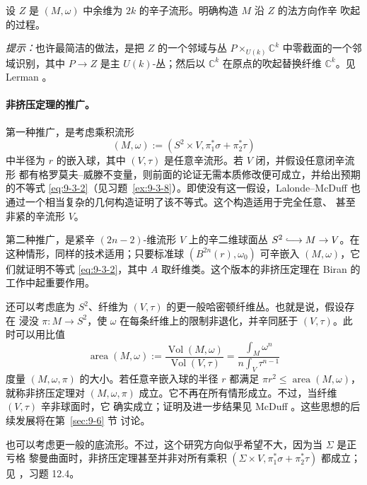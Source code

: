 \begin{exercise}\label{ex:9-3-7}
设 $Z$ 是 $(M,\omega)$ 中余维为 $2k$ 的辛子流形。明确构造 $M$ 沿 $Z$ 的法方向作辛
吹起的过程。

\emph{提示：}也许最简洁的做法，是把 $Z$ 的一个邻域与丛
$P\times_{U(k)}\mathbb C^k$ 中零截面的一个邻域识别，其中
$P\to Z$ 是主 $U(k)$-丛；然后以 $\mathbb C^k$ 在原点的吹起替换纤维
$\mathbb C^k$。见 Lerman 。
\end{exercise}

\paragraph{非挤压定理的推广。}

第一种推广，是考虑乘积流形
\[
  (M,\omega):=(S^2\times V,\pi_1^*\sigma+\pi_2^*\tau)
\]
中半径为 $r$ 的嵌入球，其中 $(V,\tau)$ 是任意辛流形。若 $V$ 闭，并假设任意闭辛流形
都有格罗莫夫--威滕不变量，则前面的论证无需本质修改便可成立，并给出预期的不等式
\eqref{eq:9-3-2}（见习题~\ref{ex:9-3-8}）。即使没有这一假设，Lalonde--McDuff
 也通过一个相当复杂的几何构造证明了该不等式。这个构造适用于完全任意、
甚至非紧的辛流形 $V$。

第二种推广，是紧辛 $(2n-2)$-维流形 $V$ 上的辛二维球面丛
$S^2\lhook\joinrel\longrightarrow M\to V$。在这种情形，同样的技术适用；只要标准球
$(B^{2n}(r),\omega_0)$ 可辛嵌入 $(M,\omega)$，它们就证明不等式
\eqref{eq:9-3-2}，其中 $A$ 取纤维类。这个版本的非挤压定理在 Biran
 的工作中起重要作用。

还可以考虑底为 $S^2$、纤维为 $(V,\tau)$ 的更一般哈密顿纤维丛。也就是说，假设存在
浸没 $\pi:M\to S^2$，使 $\omega$ 在每条纤维上的限制非退化，并辛同胚于
$(V,\tau)$。此时可以用比值
\[
  \operatorname{area}(M,\omega)
  :=\frac{\operatorname{Vol}(M,\omega)}{\operatorname{Vol}(V,\tau)}
  =\frac{\displaystyle\int_M\omega^n}
         {\displaystyle n\int_V\tau^{n-1}}
\]
度量 $(M,\omega,\pi)$ 的大小。若任意辛嵌入球的半径 $r$ 都满足
$\pi r^2\le\operatorname{area}(M,\omega)$，就称非挤压定理对
$(M,\omega,\pi)$ 成立。它不再在所有情形成立。不过，当纤维 $(V,\tau)$ 辛非球面时，它
确实成立；证明及进一步结果见 McDuff 。这些思想的后续发展将在第~\ref{sec:9-6} 节
讨论。

也可以考虑更一般的底流形。不过，这个研究方向似乎希望不大，因为当 $\Sigma$ 是正亏格
黎曼曲面时，非挤压定理甚至并非对所有乘积
$(\Sigma\times V,\pi_1^*\sigma+\pi_2^*\tau)$ 都成立；见
，习题 12.4。

